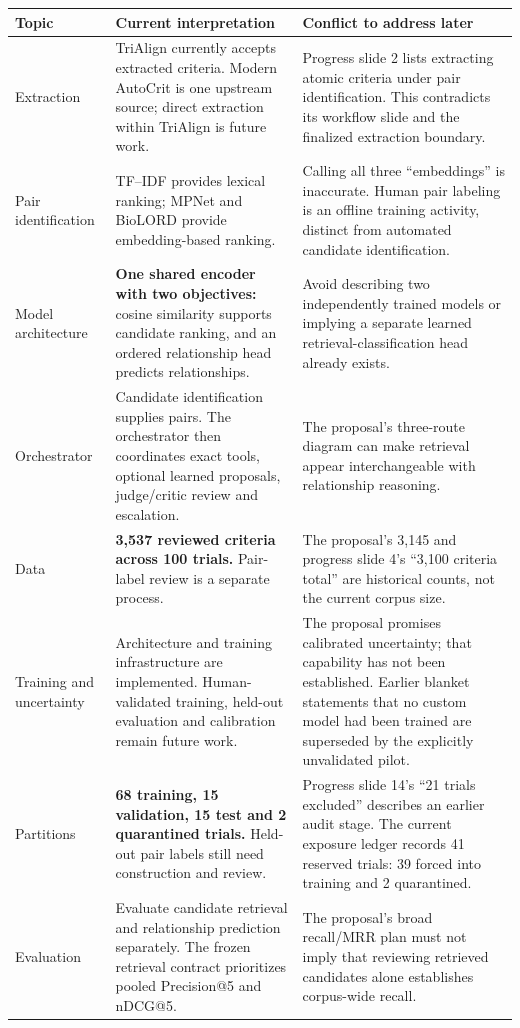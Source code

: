 \documentclass[10pt,letterpaper]{article}
\begin{document}
\begingroup\small
\begin{longtable}{L{.15\linewidth}L{.40\linewidth}L{.36\linewidth}}
\toprule Topic & Current interpretation & Conflict to address later\\\midrule
\endhead
Extraction & TriAlign currently accepts extracted criteria. Modern AutoCrit is one upstream source; direct extraction within TriAlign is future work. & Progress slide 2 lists extracting atomic criteria under pair identification. This contradicts its workflow slide and the finalized extraction boundary.\\
Pair identification & TF--IDF provides lexical ranking; MPNet and BioLORD provide embedding-based ranking. & Calling all three ``embeddings'' is inaccurate. Human pair labeling is an offline training activity, distinct from automated candidate identification.\\
Model architecture & \textbf{One shared encoder with two objectives:} cosine similarity supports candidate ranking, and an ordered relationship head predicts relationships. & Avoid describing two independently trained models or implying a separate learned retrieval-classification head already exists.\\
Orchestrator & Candidate identification supplies pairs. The orchestrator then coordinates exact tools, optional learned proposals, judge/critic review and escalation. & The proposal's three-route diagram can make retrieval appear interchangeable with relationship reasoning.\\
Data & \textbf{3,537 reviewed criteria across 100 trials.} Pair-label review is a separate process. & The proposal's 3,145 and progress slide 4's ``3,100 criteria total'' are historical counts, not the current corpus size.\\
Training and uncertainty & Architecture and training infrastructure are implemented. Human-validated training, held-out evaluation and calibration remain future work. & The proposal promises calibrated uncertainty; that capability has not been established. Earlier blanket statements that no custom model had been trained are superseded by the explicitly unvalidated pilot.\\
Partitions & \textbf{68 training, 15 validation, 15 test and 2 quarantined trials.} Held-out pair labels still need construction and review. & Progress slide 14's ``21 trials excluded'' describes an earlier audit stage. The current exposure ledger records 41 reserved trials: 39 forced into training and 2 quarantined.\\
Evaluation & Evaluate candidate retrieval and relationship prediction separately. The frozen retrieval contract prioritizes pooled Precision@5 and nDCG@5. & The proposal's broad recall/MRR plan must not imply that reviewing retrieved candidates alone establishes corpus-wide recall.\\\bottomrule
\end{longtable}
\endgroup
\end{document}
